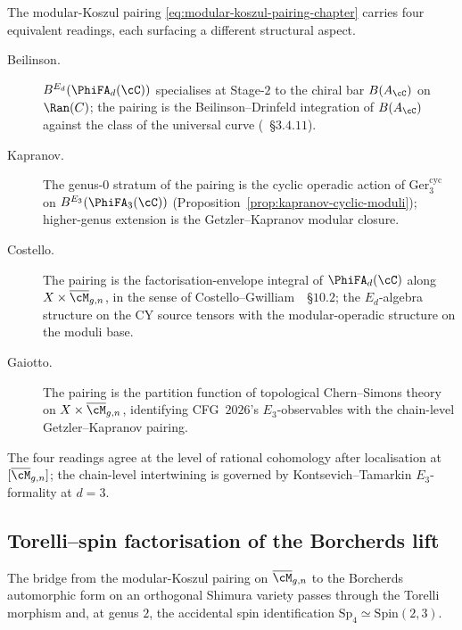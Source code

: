 \begin{remark}
\label{rem:modular-koszul-four-voices}
The modular-Koszul pairing \eqref{eq:modular-koszul-pairing-chapter}
carries four equivalent readings, each surfacing a different
structural aspect.
\begin{description}
\item[Beilinson.] $B^{E_d}(\PhiFA_d(\cC))$ specialises at Stage-$2$ to
the chiral bar $B(A_\cC)$ on $\Ran(C)$; the pairing is the
Beilinson--Drinfeld integration of $B(A_\cC)$ against the class of the
universal curve (\cite{BeilinsonDrinfeld}~\S$3.4.11$).
\item[Kapranov.] The genus-$0$ stratum of the pairing is the cyclic
operadic action of $\mathrm{Ger}_3^{\mathrm{cyc}}$ on
$B^{E_3}(\PhiFA_3(\cC))$ (Proposition~\ref{prop:kapranov-cyclic-moduli});
higher-genus extension is the Getzler--Kapranov modular closure.
\item[Costello.] The pairing is the factorisation-envelope integral of
$\PhiFA_d(\cC)$ along $X \times \overline{\cM}_{g, n}$, in the sense
of Costello--Gwilliam~\cite{CostelloGwilliam2}~\S$10.2$; the
$E_d$-algebra structure on the CY source tensors with the
modular-operadic structure on the moduli base.
\item[Gaiotto.] The pairing is the partition function of topological
Chern--Simons theory on $X \times \overline{\cM}_{g, n}$, identifying
CFG~$2026$'s $E_3$-observables with the chain-level
Getzler--Kapranov pairing.
\end{description}
The four readings agree at the level of rational cohomology after
localisation at $[\overline{\cM}_{g, n}]$; the chain-level
intertwining is governed by Kontsevich--Tamarkin $E_3$-formality at
$d = 3$.
\end{remark}

\subsection{Torelli--spin factorisation of the Borcherds lift}

The bridge from the modular-Koszul pairing on $\overline{\cM}_{g, n}$
to the Borcherds automorphic form on an orthogonal Shimura variety
passes through the Torelli morphism and, at genus \(2\), the accidental
spin identification \(\mathrm{Sp}_4\simeq \mathrm{Spin}(2,3)\).

